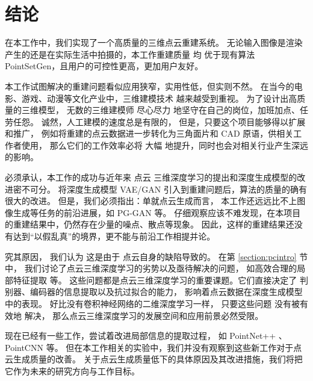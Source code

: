 \chapter{%
  结论}
\label{cha:summ}

在本工作中，我们实现了一个高质量的三维点云重建系统。
无论输入图像是渲染产生的还是在实际生活中拍摄的，本工作重建质量%
均
优于现有算法 PointSetGen\cite{pointsetgen}，且用户的可控性更高，更加用户友好。%

本工作试图解决的重建问题看似应用狭窄，实用性低，但实则不然。
在当今的电影、游戏、动漫等文化产业中，三维建模技术%
越来越受到重视。
为了设计出高质量的三维模型，%
无数的三维建模师%
尽心尽力
地坚守在自己的岗位，加班加点、任劳任怨。
诚然，人工建模的速度总是有限的，
但是，只要这个项目能够得以扩展和推广，
例如将重建的点云数据进一步转化为三角面片和 CAD 原语，供相关工作者使用，
那么它们的工作效率必将%
大幅%
地提升，同时也会对相关行业产生深远的影响。




必须承认，本工作的成功与近年来%
点云%
三维深度学习的提出和深度生成模型的改进密不可分。
将深度生成模型 VAE/GAN\cite{vaegan} 引入到重建问题后，算法的质量的确有很大的改进。
但是，我们必须指出：单就点云生成而言，
本工作还远远比不上图像生成等任务的前沿进展，如 PG-GAN\cite{pggan} 等。
仔细观察应该不难发现，在本项目的重建结果中，仍然存在少量的噪点、散点等现象。%
因此，这样的重建结果还没有达到“以假乱真”的境界，更不能与前沿工作相提并论。

究其原因，%
我们认为
这是由于
点云自身的缺陷导致的。
在第 \ref{section:pcintro} 节中，
我们讨论了点云三维深度学习的劣势以及亟待解决的问题，
如高效合理的局部特征提取%
等。
这些问题都是点云三维深度学习的重要课题。它们直接决定了
判别器、编码器的信息提取以及抗过拟合的能力，
影响着点云数据在深度生成模型中的表现。
好比没有卷积神经网络的二维深度学习一样，
只要这些问题%
没有被有效地%
解决，
那么点云三维深度学习的发展空间和应用前景必然受限。%

现在已经有一些工作，尝试着改进局部信息的提取过程，
如 PointNet++ \cite{pointnet2}、PointCNN \cite{pointcnn}等。
但在本工作相关的实验中，我们并没有观察到这些新工作对于点云生成质量的改善。%
关于点云生成质量低下的具体原因及其改进措施，我们将把它作为未来的研究方向与工作目标。


